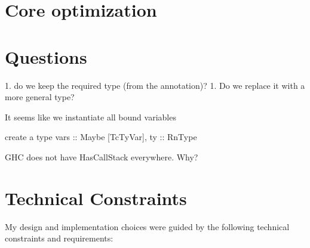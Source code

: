 
% 
% 





\section{Core optimization}


\section{Questions}

1. do we keep the required type (from the annotation)?
1. Do we replace it with a more general type?

It seems like we instantiate all bound variables

create a type { vars :: Maybe [TcTyVar], ty :: RnType}


GHC does not have HasCallStack everywhere. Why?

\section{Technical Constraints}
\label{chap:LiteratureReview:sec:AstRepresentations:TechnicalConstraints}

My design and implementation choices were guided by the following technical constraints and requirements:

